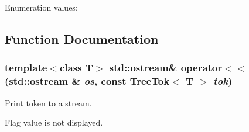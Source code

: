 \begin{Desc}
\item[Enumeration values: ]\par
\begin{description}
\item[{\em 
LB\label{treetok_8h_a4a0}
}]\item[{\em 
RB\label{treetok_8h_a4a1}
}]\item[{\em 
LEAF\label{treetok_8h_a4a2}
}]\end{description}
\end{Desc}



\subsection{Function Documentation}
\subsubsection{\setlength{\rightskip}{0pt plus 5cm}template$<$class T$>$ std::ostream\& operator$<$$<$ (std::ostream \& {\em os}, const {\bf Tree\-Tok}$<$ T $>$ {\em tok})}\label{treetok_8h_a3}


Print token to a stream. 

Flag value is not displayed. 